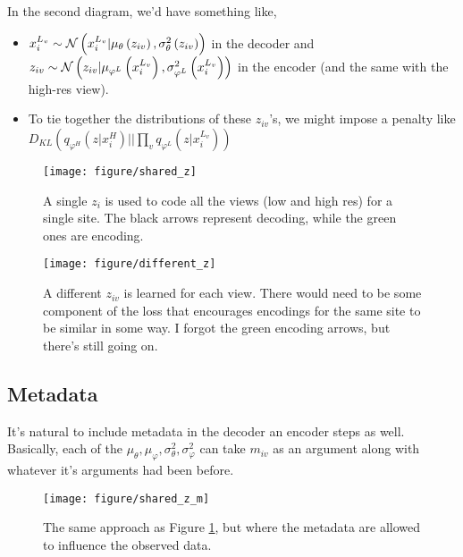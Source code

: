 \documentclass{article}
\begin{document}
In the second diagram, we'd have something like,
\begin{itemize}
\item $x_i^{L_v} \sim \mathcal{N}\left(x_i^{L_v} \vert \mu_{\theta}\left(z_{iv}\right),
  \sigma^{2}_{\theta}\left(z_{iv}\right)\right)$ in the decoder and $z_{iv} \sim
  \mathcal{N}\left(z_{iv} \vert \mu_{\varphi^{L}}\left(x_{i}^{L_v}\right),
  \sigma_{\varphi^{L}}^{2}\left(x_i^{L_v}\right)\right)$ in the encoder (and the
  same with the high-res view).
\item To tie together the distributions of these $z_{iv}$'s, we might impose a
  penalty like $D_{KL}\left(q_{\varphi^H}\left(z \vert x_i^{H} \right) \vert \vert
  \prod_{v} q_{\varphi^L}\left(z\vert x_{i}^{L_v}\right)\right)$ 
\end{itemize}

\begin{figure}[ht]
  \centering
  \texttt{[image: figure/shared\_z]}
  \caption{A single $z_i$ is used to code all the views (low and high res) for a
    single site. The black arrows represent decoding, while the green ones are
    encoding. \label{fig:shared_z} }
\end{figure}

\begin{figure}[ht]
  \centering
  \texttt{[image: figure/different\_z]}
  \caption{A different $z_{iv}$ is learned for each view. There would need to be
    some component of the loss that encourages encodings for the same site to be
    similar in some way. I forgot the green encoding arrows, but there's still
    going on. \label{fig:different_z} }
\end{figure}

\subsection{Metadata}
\label{subsec:metadata}

It's natural to include metadata in the decoder an encoder steps as well.
Basically, each of the $\mu_{\theta}, \mu_{\varphi}, \sigma^{2}_{\theta},
\sigma^2_{\varphi}$ can take $m_{iv}$ as an argument along with whatever it's
arguments had been before.

\begin{figure}[ht]
  \centering
  \texttt{[image: figure/shared\_z\_m]}
  \caption{The same approach as Figure \ref{fig:shared_z}, but where the
    metadata are allowed to influence the observed data. \label{fig:shared_z_m}
  }
\end{figure}
\end{document}
